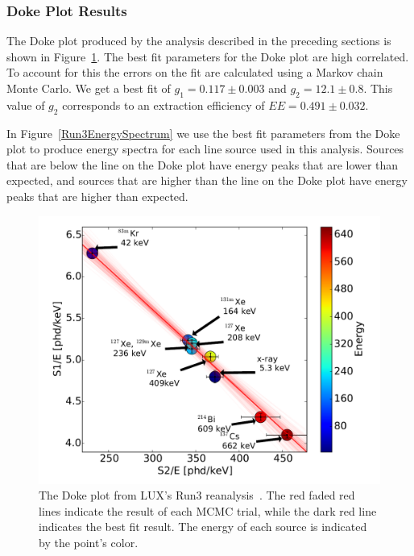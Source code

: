 \subsubsection{Doke Plot Results}


The Doke plot produced by the analysis described in the preceding sections is shown
in Figure~\ref{DokePlot}.  The best fit parameters for the Doke plot are high correlated.  To account for this the errors on the fit are calculated using a Markov chain Monte Carlo.  We get a best fit of $g_1= 0.117 \pm 0.003$ and $g_2=12.1 \pm 0.8$.  This value of $g_2$ corresponds to an extraction efficiency of $EE = 0.491 \pm 0.032$.

In Figure~\ref{Run3EnergySpectrum} we use the best fit parameters from the Doke plot to produce energy spectra for each line source used in this analysis.  Sources that are below the line on the Doke plot have energy peaks that are lower than expected, and sources that are higher than the line on the Doke plot have energy peaks that are higher than expected.

\begin{figure}[H]
\centering
\includegraphics[scale=0.3]{DokePlot.png}
\caption{The Doke plot from LUX's Run3 reanalysis~\cite{Akerib:2015rjg}.  The red faded red lines indicate the result of each MCMC trial, while the dark red line indicates the best fit result.  The energy of each source is indicated by the point's color.}
\label{DokePlot}
\end{figure}

